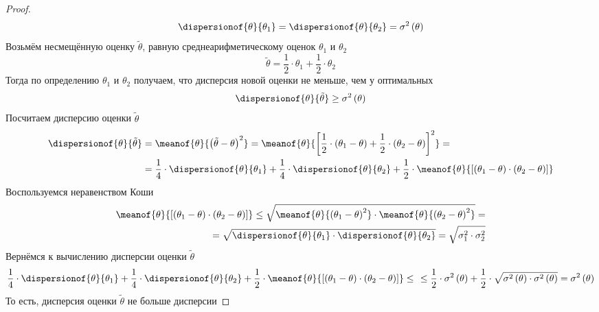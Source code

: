 \begin{proof}
  $$\dispersionof{\theta}{\theta_1}
    = \dispersionof{\theta}{\theta_2}
    = \sigma^2\left(\theta\right)$$
  Возьмём несмещённую оценку $\tilde{\theta}$,
  равную среднеарифметическому оценок $\theta_1$ и $\theta_2$
  $$\tilde{\theta}= \frac{1}{2}\cdot\theta_1+\frac{1}{2}\cdot\theta_2$$
  Тогда по определению $\theta_1$ и $\theta_2$ получаем,
  что дисперсия новой оценки не меньше, чем у оптимальных
  \begin{equation}\label{eq:estimator_ge}
    \dispersionof{\theta}{\tilde{\theta}}\ge\sigma^2\left(\theta\right)
  \end{equation}
  Посчитаем дисперсию оценки $\tilde{\theta}$
  \begin{align*}
  \dispersionof{\theta}{\tilde{\theta}}
    &= \meanof{\theta}{\left( \tilde{\theta}-\theta \right)^2}
    = \meanof{\theta}{\left[ \frac{1}{2}\cdot\left( \theta_1-\theta \right)
      + \frac{1}{2}\cdot\left( \theta_2-\theta \right) \right]^2}=\\
    &= \frac{1}{4}\cdot\dispersionof{\theta}{\theta_1}
      + \frac{1}{4}\cdot\dispersionof{\theta}{\theta_2}
      + \frac{1}{2}\cdot\meanof{\theta}
        {\left[ \left( \theta_1-\theta \right)
          \cdot\left( \theta_2-\theta \right) \right]}
  \end{align*}
  Воспользуемся неравенством Коши%
  \begin{eqnarray}\label{eq:koshi_eq}
    \meanof{\theta}{\left[ \left( \theta_1-\theta \right)
      \cdot\left( \theta_2-\theta \right) \right]}
    \le\sqrt{\meanof{\theta}{\left( \theta_1-\theta \right)^2}
      \cdot\meanof{\theta}{\left( \theta_2-\theta \right)^2}}= \\
    = \sqrt{\dispersionof{\theta}{\theta_1}
      \cdot\dispersionof{\theta}{\theta_2}}
    = \sqrt{\sigma_1^2\cdot\sigma_2^2}\nonumber
  \end{eqnarray}
  Вернёмся к вычислению дисперсии оценки $\tilde{\theta}$
  \begin{align*}
    \frac{1}{4}\cdot\dispersionof{\theta}{\theta_1}
      + \frac{1}{4}\cdot\dispersionof{\theta}{\theta_2}
      + \frac{1}{2}\cdot\meanof{\theta}
        {\left[ \left( \theta_1-\theta \right)
          \cdot\left( \theta_2-\theta \right) \right]}\le\ \
    \le\frac{1}{2}\cdot\sigma^2\left( \theta \right)
      + \frac{1}{2}\cdot\sqrt{\sigma^2\left( \theta \right)
        \cdot\sigma^2\left( \theta \right)}
    = \sigma^2\left( \theta \right)
  \end{align*}
  То есть, дисперсия оценки $\tilde{\theta}$ не больше дисперсии

\end{proof}
